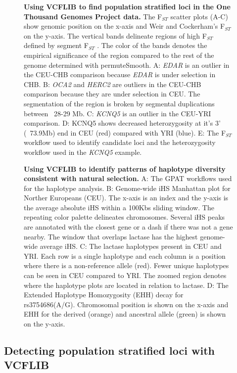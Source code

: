 \documentclass[10pt,letterpaper]{article}
\begin{document}
\begin{figure}[h]

\caption{{\bf Using VCFLIB to find population stratified loci in the One Thousand Genomes Project data.} The  F$_{ST}$  scatter plots (A-C) show genomic position on the x-axis and Weir and Cockerham's  F$_{ST}$  on the y-axis.  The vertical bands delineate regions of high  F$_{ST}$  defined by segment F$_{ST}$ .  The color of the bands denotes the empirical significance of the region compared to the rest of the genome determined with permuteSmooth.  A: \textit{EDAR} is an outlier in the CEU-CHB comparison because \textit{EDAR} is under selection in CHB.  B: \textit{OCA2} and \textit{HERC2} are outliers in the CEU-CHB comparison because they are under selection in CEU.  The segmentation of the region is broken by segmental duplications between ~28-29 Mb.  C: \textit{KCNQ5} is an outlier in the CEU-YRI comparison.  D:  KCNQ5 shows decreased heterozygosity at it's 3' (~73.9Mb) end in CEU (red) compared with YRI (blue).  E: The  F$_{ST}$  workflow used to identify candidate loci and the heterozygosity workflow used in the \textit{KCNQ5} example.}
\label{fig1}
\end{figure}

\begin{figure}[h]

\caption{{\bf Using VCFLIB to identify patterns of haplotype diversity consistent with natural selection.} A: The GPAT 
workflows used for the haplotype analysis. B: Genome-wide iHS Manhattan plot for Norther Europeans (CEU).  The x-axis is an index and the y-axis is the average absolute iHS within a 100Kbs sliding window.  The repeating color palette delineates chromosomes.  Several iHS peaks are annotated with the closest gene or a dash if there was not a gene nearby. The window that overlaps lactase has the highest genome-wide average iHS.  C: The lactase haplotypes present in CEU and YRI.  Each row is a single haplotype and each column is a position where there is a non-reference allele (red).  Fewer unique haplotypes can be seen in CEU compared to YRI.   The zoomed region denotes where the haplotype plots are located in relation to lactase. D:  The Extended Haplotype Homozygosity (EHH) decay for rs3754686(A/G).  Chromosomal position is shown on the x-axis and EHH for the derived (orange) and ancestral allele (green) is shown on the y-axis.}
\label{fig2}
\end{figure}

\subsection*{Detecting population stratified loci with VCFLIB}
\end{document}
